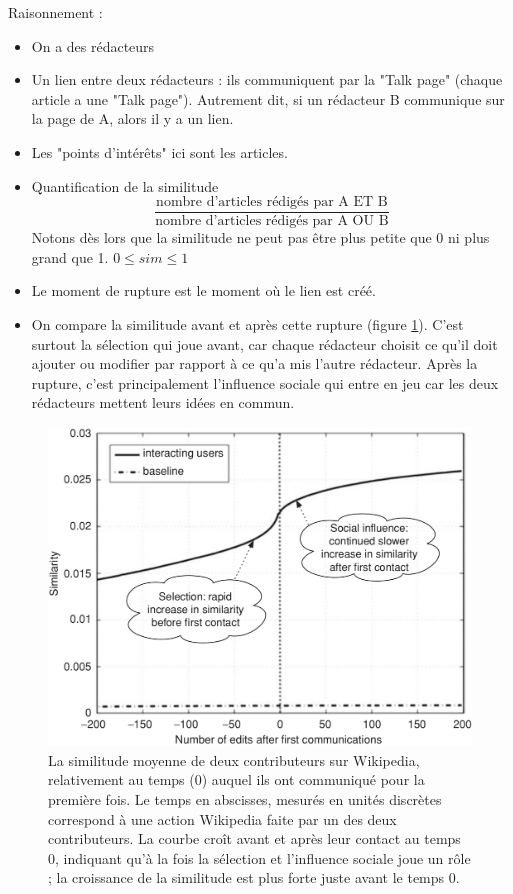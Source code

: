 Raisonnement :
\begin{itemize}
\item On a des rédacteurs
\item Un lien entre deux rédacteurs : ils communiquent par la "Talk page" (chaque article a une "Talk page"). Autrement dit, si un rédacteur B communique sur la page de A, alors il y a un lien.
\item Les "points d'intérêts" ici sont les articles.
\item Quantification de la similitude
	$$\displaystyle\frac{\mbox{nombre d'articles rédigés par A ET B}}{\mbox{nombre d'articles rédigés par A OU B}}$$
Notons dès lors que la similitude ne peut pas être plus petite que 0 ni plus grand que 1. $0 \leq sim \leq 1$
\item Le moment de rupture est le moment où le lien est créé.
\item On compare la similitude avant et après cette rupture (figure
    \ref{wikipedia}). C'est surtout la sélection qui joue avant, car chaque rédacteur choisit ce qu'il doit ajouter ou modifier par rapport à ce qu'a mis l'autre rédacteur. Après la rupture, c'est principalement l'influence sociale qui entre en jeu car les deux rédacteurs mettent leurs idées en commun. %
\end{itemize}

\begin{figure}[!ht]
    \includegraphics[width=\textwidth]{images/21_wikipedia.png}
    \caption{La similitude moyenne de deux contributeurs sur Wikipedia,
        relativement au temps (0) auquel ils ont communiqué pour la
        première fois. Le temps en abscisses, mesurés en unités
        discrètes correspond à une action Wikipedia faite par un des
        deux contributeurs. La courbe croît avant et après leur contact
        au temps 0, indiquant qu'à la fois la sélection et l'influence
        sociale joue un rôle ; la croissance de la similitude est plus
    forte juste avant le temps 0.}
    \label{wikipedia}
\end{figure}

